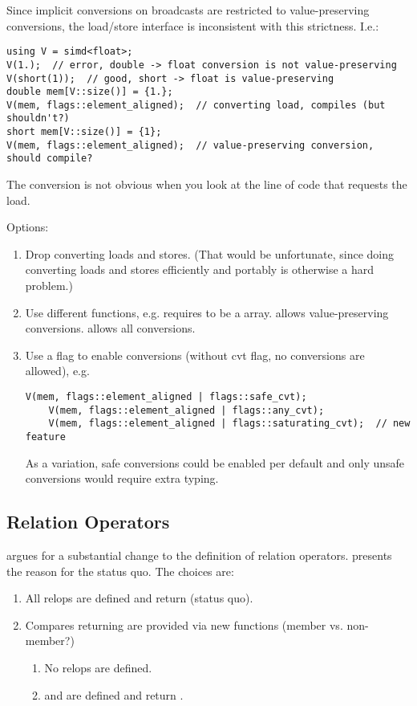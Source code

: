 Since implicit conversions on broadcasts are restricted to value-preserving conversions, the load/store interface is inconsistent with this strictness.
I.e.:

\begin{lstlisting}[style=Vc]
using V = simd<float>;
V(1.);  // error, double -> float conversion is not value-preserving
V(short(1));  // good, short -> float is value-preserving
double mem[V::size()] = {1.};
V(mem, flags::element_aligned);  // converting load, compiles (but shouldn't?)
short mem[V::size()] = {1};
V(mem, flags::element_aligned);  // value-preserving conversion, should compile?
\end{lstlisting}

The conversion is not obvious when you look at the line of code that requests the load.

Options:
\begin{enumerate}
  \item Drop converting loads and stores.
    (That would be unfortunate, since doing converting loads and stores efficiently and portably is otherwise a hard problem.)

  \item Use different functions, e.g.  requires  to be a  array.  allows value-preserving conversions.
     allows all conversions.

  \item Use a flag to enable conversions (without cvt flag, no conversions are allowed), e.g.
    \begin{lstlisting}[style=Vc]
    V(mem, flags::element_aligned | flags::safe_cvt);
    V(mem, flags::element_aligned | flags::any_cvt);
    V(mem, flags::element_aligned | flags::saturating_cvt);  // new feature
    \end{lstlisting}
    As a variation, safe conversions could be enabled per default and only unsafe conversions would require extra typing.

\end{enumerate}

\subsection{Relation Operators}
\textcite{P0820R1} argues for a substantial change to the definition of relation operators.
\textcite{P0851R0} presents the reason for the status quo.
The choices are:
\begin{enumerate}
  \item All relops are defined and return \mask (status quo).
  \item Compares returning \mask are provided via new functions (member vs. non-member?)
    \begin{enumerate}
      \item No relops are defined.
      \item {} and  are defined and return \bool.
    \end{enumerate}
\end{enumerate}


